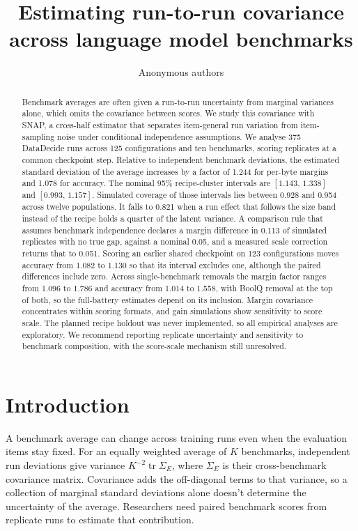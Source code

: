 \documentclass{article}
\title{Estimating run-to-run covariance\\across language model benchmarks}
\author{Anonymous authors}
\newcommand{\ci}[2]{\ensuremath{[#1,\,#2]}}
\newcommand{\Sig}{\Sigma_E}
\begin{document}
\maketitle
\begin{abstract}
Benchmark averages are often given a run-to-run uncertainty from marginal variances alone, which omits the covariance between scores. We study this covariance with SNAP, a cross-half estimator that separates item-general run variation from item-sampling noise under conditional independence assumptions. We analyse 375 DataDecide runs across 125 configurations and ten benchmarks, scoring replicates at a common checkpoint step. Relative to independent benchmark deviations, the estimated standard deviation of the average increases by a factor of 1.244 for per-byte margins and 1.078 for accuracy. The nominal 95\% recipe-cluster intervals are \ci{1.143}{1.338} and \ci{0.993}{1.157}. Simulated coverage of those intervals lies between 0.928 and 0.954 across twelve populations. It falls to 0.821 when a run effect that follows the size band instead of the recipe holds a quarter of the latent variance. A comparison rule that assumes benchmark independence declares a margin difference in 0.113 of simulated replicates with no true gap, against a nominal 0.05, and a measured scale correction returns that to 0.051. Scoring an earlier shared checkpoint on 123 configurations moves accuracy from 1.082 to 1.130 so that its interval excludes one, although the paired differences include zero. Across single-benchmark removals the margin factor ranges from 1.096 to 1.786 and accuracy from 1.014 to 1.558, with BoolQ removal at the top of both, so the full-battery estimates depend on its inclusion. Margin covariance concentrates within scoring formats, and gain simulations show sensitivity to score scale. The planned recipe holdout was never implemented, so all empirical analyses are exploratory. We recommend reporting replicate uncertainty and sensitivity to benchmark composition, with the score-scale mechanism still unresolved.
\end{abstract}

\section{Introduction}
A benchmark average can change across training runs even when the evaluation items stay fixed. For an equally weighted average of $K$ benchmarks, independent run deviations give variance $K^{-2}\operatorname{tr}\Sig$, where $\Sig$ is their cross-benchmark covariance matrix. Covariance adds the off-diagonal terms to that variance, so a collection of marginal standard deviations alone doesn't determine the uncertainty of the average. Researchers need paired benchmark scores from replicate runs to estimate that contribution.
\end{document}
